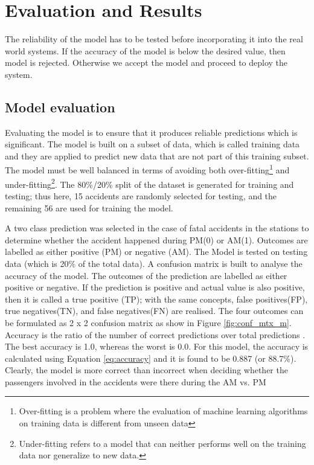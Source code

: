 \chapter{Evaluation and Results}

The reliability of the model has to be tested before incorporating it into the real world systems. If the accuracy of the model is below the desired value, then model is rejected. Otherwise we accept the model and proceed to deploy the system.

\section{Model evaluation}
Evaluating the model is to ensure that it produces reliable predictions which is significant. The model is built on a subset of data, which is called training data and they are applied to predict new data that are not part of this training subset. The model must be well balanced in terms of avoiding both over-fitting\footnote{Over-fitting is a problem where the evaluation of machine learning algorithms on training data is different from unseen data} and under-fitting\footnote{Under-fitting refers to a model that can neither performs well on the training data nor generalize to new data.}. The 80\%/20\% split of the dataset is generated for training and testing; thus here, 15 accidents are randomly selected for testing, and the remaining 56 are used for training the model. 

A two class prediction was selected in the case of fatal accidents in the stations to determine whether the accident happened during PM(0) or AM(1). Outcomes are labelled as either positive (PM) or negative (AM). The Model is tested on testing data (which is 20\% of the total data). A confusion matrix is built to analyse the accuracy of the model. The outcomes of the prediction are labelled as either positive or negative. If the prediction is positive and actual value is  also positive, then it is called a true positive (TP); with the same concepts, false positives(FP), true negatives(TN), and false negatives(FN) are realised. The four outcomes can be formulated as 2 x 2 confusion matrix as show in Figure \ref{fig:conf_mtx_m}. Accuracy is the ratio of the number of correct predictions over total predictions \cite{skiena_data_2017}. The best accuracy is 1.0, whereas the worst is 0.0. For this model, the accuracy is calculated using Equation \ref{eq:accuracy} and it is found to be 0.887 (or 88.7\%). Clearly, the model is more correct than incorrect when deciding whether the passengers involved in the accidents were there during the AM vs. PM

